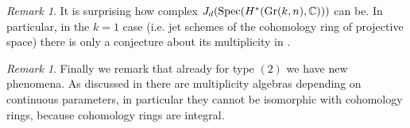 \documentclass[12pt]{article}
\numberwithin{equation}{section}
\theoremstyle{remark}
\newtheorem{remark}[theorem]{Remark}
\numberwithin{theorem}{section}
\def\calE{{\mathcal E}}
\DeclareMathOperator{\Spec}{Spec}
\def\C{\mathbb{C}}
\def\P{\mathbb{P}}
\newcommand{\Gr}{\textnormal{Gr}}
\numberwithin{equation}{section}
\begin{document}
\begin{remark}It is surprising how complex $J_d(\Spec(H^*(\Gr(k,n),\C)))$ can be. In particular, in the $k=1$ case (i.e. jet schemes of the cohomology ring of projective space) there is only a conjecture about its multiplicity in \cite[Conjecture III.21]{yuenthesis}.
\end{remark}

\begin{remark} Finally we remark that already for type $(2)$ we have new phenomena. As discussed in \cite[\S 5.4]{hitchin4} there are multiplicity algebras depending on continuous parameters, in particular they cannot be isomorphic with cohomology rings, because cohomology rings are integral. \end{remark}
	
	
\end{document}

